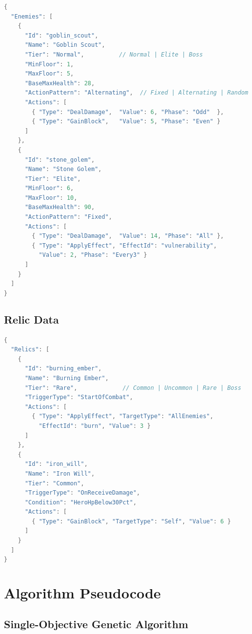 \begin{lstlisting}[language=C, caption={EnemyData JSON schema and example entries}]
{
  "Enemies": [
    {
      "Id": "goblin_scout",
      "Name": "Goblin Scout",
      "Tier": "Normal",          // Normal | Elite | Boss
      "MinFloor": 1,
      "MaxFloor": 5,
      "BaseMaxHealth": 28,
      "ActionPattern": "Alternating",  // Fixed | Alternating | Random
      "Actions": [
        { "Type": "DealDamage",  "Value": 6, "Phase": "Odd"  },
        { "Type": "GainBlock",   "Value": 5, "Phase": "Even" }
      ]
    },
    {
      "Id": "stone_golem",
      "Name": "Stone Golem",
      "Tier": "Elite",
      "MinFloor": 6,
      "MaxFloor": 10,
      "BaseMaxHealth": 90,
      "ActionPattern": "Fixed",
      "Actions": [
        { "Type": "DealDamage",  "Value": 14, "Phase": "All" },
        { "Type": "ApplyEffect", "EffectId": "vulnerability",
          "Value": 2, "Phase": "Every3" }
      ]
    }
  ]
}
\end{lstlisting}

\subsection{Relic Data}

\begin{lstlisting}[language=C, caption={RelicData JSON schema and example entry}]
{
  "Relics": [
    {
      "Id": "burning_ember",
      "Name": "Burning Ember",
      "Tier": "Rare",             // Common | Uncommon | Rare | Boss
      "TriggerType": "StartOfCombat",
      "Actions": [
        { "Type": "ApplyEffect", "TargetType": "AllEnemies",
          "EffectId": "burn", "Value": 3 }
      ]
    },
    {
      "Id": "iron_will",
      "Name": "Iron Will",
      "Tier": "Common",
      "TriggerType": "OnReceiveDamage",
      "Condition": "HeroHpBelow30Pct",
      "Actions": [
        { "Type": "GainBlock", "TargetType": "Self", "Value": 6 }
      ]
    }
  ]
}
\end{lstlisting}

\section{Algorithm Pseudocode}
\label{app:pseudocode}

\subsection{Single-Objective Genetic Algorithm}

